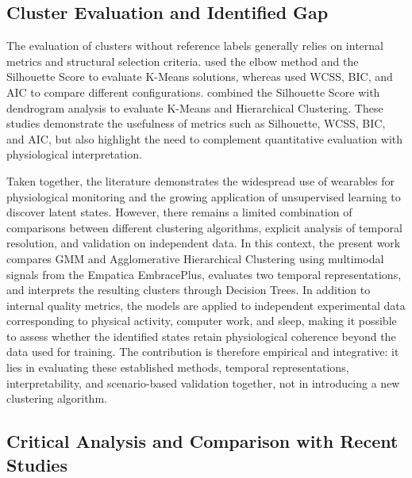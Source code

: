 \documentclass[a4paper,fleqn]{cas-sc}
\newcommand{\newtextblue}[1]{{\color{blue}#1}}
\newcommand{\newtextgreen}[1]{{\color{green!60!black}#1}}
\begin{document}
\subsection{Cluster Evaluation and Identified Gap}

The evaluation of clusters without reference labels generally relies on internal metrics and structural selection criteria. \citet{messaoud2025} used the elbow method and the Silhouette Score to evaluate K-Means solutions, whereas \citet{georgiev2026} used WCSS, BIC, and AIC to compare different configurations. \citet{georgieva2025} combined the Silhouette Score with dendrogram analysis to evaluate K-Means and Hierarchical Clustering. These studies demonstrate the usefulness of metrics such as Silhouette, WCSS, BIC, and AIC, but also highlight the need to complement quantitative evaluation with physiological interpretation.

\medskip

Taken together, the literature demonstrates the widespread use of wearables for physiological monitoring and the growing application of unsupervised learning to discover latent states. However, there remains a limited combination of comparisons between different clustering algorithms, explicit analysis of temporal resolution, and validation on independent data. In this context, the present work compares GMM and Agglomerative Hierarchical Clustering using multimodal signals from the Empatica EmbracePlus, evaluates two temporal representations, and interprets the resulting clusters through Decision Trees. In addition to internal quality metrics, the models are applied to independent experimental data corresponding to physical activity, computer work, and sleep, making it possible to assess whether the identified states retain physiological coherence beyond the data used for training. \newtextblue{The contribution is therefore empirical and integrative: it lies in evaluating these established methods, temporal representations, interpretability, and scenario-based validation together, not in introducing a new clustering algorithm.}

\subsection{\newtextgreen{Critical Analysis and Comparison with Recent Studies}}\label{sec:critical}
\end{document}
